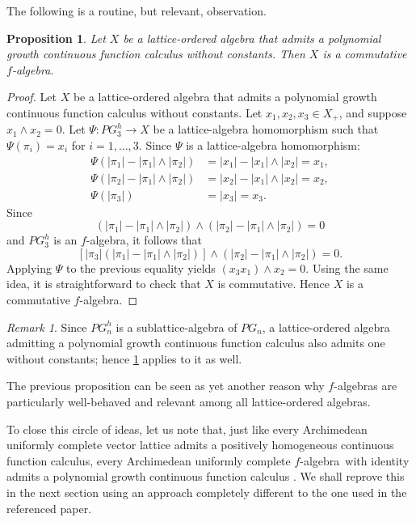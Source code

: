 \documentclass{amsart}
\theoremstyle{plain}
\newtheorem{prop}[thm]{Proposition}
\theoremstyle{definition}
\theoremstyle{remark}
\newtheorem*{rem}{Remark}
\newcommand{\falg}{$f\!$-algebra}
\begin{document}
The following is a routine, but relevant, observation.

\begin{prop}\label{prop:admitPG}
    Let $X$ be a lattice-ordered algebra that admits a polynomial
    growth continuous function calculus without constants. Then $X$ is a commutative
    \falg.
\end{prop}
\begin{proof}
    Let $X$ be a lattice-ordered algebra that admits a polynomial
    growth continuous function calculus without constants. Let $x_1,x_2,x_3\in X_+$,
    and suppose $x_1\wedge x_2=0$. Let $\Psi \colon PG_3^{h}\to X$ be a
    lattice-algebra homomorphism such that $\Psi (\pi _i)=x_i$ for
    $i=1,\ldots ,3$. Since $\Psi $ is a lattice-algebra homomorphism:
    \begin{align*}
        \Psi (|\pi _1|-|\pi _1|\wedge |\pi _2|)&=|x_1|-|x_1|\wedge
        |x_2|=x_1,\\
        \Psi (|\pi _2|-|\pi _1|\wedge |\pi _2|)&=|x_2|-|x_1|\wedge
        |x_2|=x_2,\\
        \Psi (|\pi _3|)&=|x_3|=x_3.
    \end{align*}
    Since
    \[
        (|\pi _1|-|\pi _1|\wedge |\pi _2|)\wedge (|\pi
        _2|-|\pi _1|\wedge |\pi _2|)=0
    \]
    and $PG_3^{h}$ is an \falg, it follows that
    \[
        [|\pi _3|(|\pi _1|-|\pi _1|\wedge |\pi _2|)]\wedge (|\pi
        _2|-|\pi _1|\wedge |\pi _2|)=0.
    \]
    Applying $\Psi$ to the previous equality yields $(x_3x_1)\wedge
    x_2=0$. Using the same idea, it is straightforward to check that $X$
    is commutative. Hence $X$ is a commutative \falg.
\end{proof}

\begin{rem}
    Since $PG_n^{h}$ is a sublattice-algebra of $PG_n$, a
    lattice-ordered algebra admitting a polynomial growth continuous
    function calculus also admits one without constants; hence
    \cref{prop:admitPG} applies to it as well.
\end{rem}

The previous proposition can be seen as yet another reason why
\falg s are particularly well-behaved and relevant among all
lattice-ordered algebras.

To close this circle of ideas, let us note that, just like every
Archimedean uniformly complete vector lattice admits a positively
homogeneous continuous function calculus, every Archimedean uniformly
complete \falg\ with identity admits a polynomial growth continuous
function calculus \cite[Theorem
4.12]{buskes_depagter_vanrooij1991}. We shall reprove this in the
next section using an approach completely different to the one used in the
referenced paper.
\end{document}

